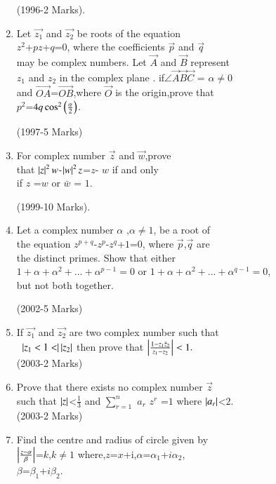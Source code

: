 \documentclass[journal]{IEEEtran}
\theoremstyle{remark}
\begin{document}
\begin{enumerate}[start=7]
\hfill(1996-2 Marks).\\
\item Let $\vec{z_1}$  and $\vec{z_2}$ be roots of the equation \\
$z^2$+$pz$+$q$=$0$, where the coefficients $\vec{p}$ and $\vec{q}$\\
may be complex numbers. Let $\Vec{A}$ and $\Vec{B}$ represent \\
$z_1$ and $z_2$ in the complex plane . if$\angle\Vec{A}\Vec{B}\Vec{C}$ = $\alpha \not=0$\\ 
and $\Vec{OA}$=$\Vec{OB}$,where $\vec{O}$ is the origin,prove that \\
$p^2$=$4q\cos^2\left(\frac{\alpha}{2}\right)$. 

\hfill(1997-5 Marks)\\
\item For complex number $\vec{z}$ and $\vec{w}$,prove \\
that $\left\vert z\right\vert^2w$-$\left\vert w\right\vert^2z$=$z$- $w$  if and only \\
if $z$ =$w$ or $\bar w$ = $1$.
   
\hfill(1999-10 Marks).\\
\item Let a complex number $\alpha$ ,$\alpha \not=1$, be a root of \\
the equation $z^{p+q}$-$z^p$-$z^q$+$1$=$0$, where $\Vec{p}$,$\Vec{q}$ are \\
the distinct primes. Show that either \\
$1+\alpha+\alpha^2+...+\alpha^{p-1}=0$ or $1+\alpha+\alpha^2+...+\alpha^{q- 1}=0$,\\
but not both together. 

\hfill(2002-5 Marks)\\
\item If $\vec{z_1}$ and $\vec{z_2}$ are two  complex number such that\\\
     $\left\vert z_1<1<\right\vert\left\vert z_2\right\vert$ then prove that $\left\vert\frac{1-z_1 \bar z_2}{z_1-z_2}\right\vert<1.$\\ 
    
    \hfill(2003-2 Marks)\\
\item Prove that there exists no  complex number $\vec{z}$ \\
      such that $\left\vert z\right\vert$<$\frac{1}{3}$ and  $\sum_{r=1}^{n}$ $a_r$ $z^r$ =$1$ where $\left\vert a_r\right\vert$<$2$.\\
      
 \hfill (2003-2 Marks)\\
\item Find the centre and radius  of circle given by\\
    $\left\vert\frac{z-\alpha} \beta\right\vert$=$k$,$k\not=1$ 
where,$z$=$x$+i,$\alpha$=$\alpha_1$+$i\alpha_2$, \\
$\beta$=$\beta_1$+$i\beta_2$. \\
    

\end{enumerate}
\end{document}
